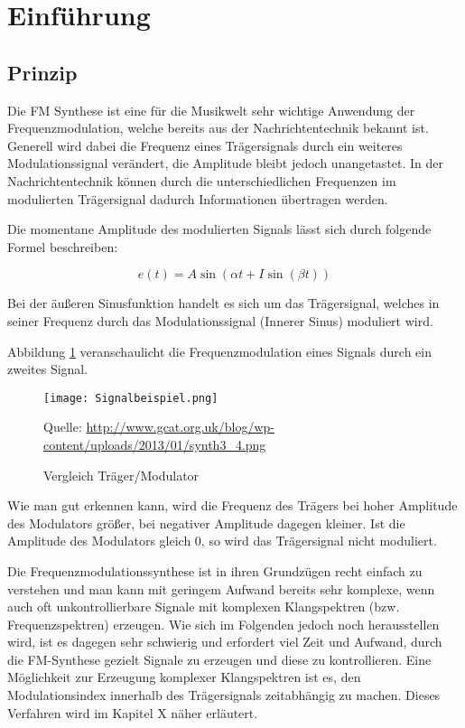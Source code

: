 \section{Einführung}

\subsection{Prinzip}
Die FM Synthese ist eine für die Musikwelt sehr wichtige Anwendung der Frequenzmodulation, welche bereits aus der Nachrichtentechnik bekannt ist. Generell wird dabei die Frequenz eines Trägersignals durch ein weiteres Modulationssignal verändert, die Amplitude bleibt jedoch unangetastet. In der Nachrichtentechnik können durch die unterschiedlichen Frequenzen im modulierten Trägersignal dadurch Informationen übertragen werden. 

Die momentane Amplitude des modulierten Signals lässt sich durch folgende Formel beschreiben:

\[
e(t) = A\sin(\alpha t + I\sin(\beta t)) 
\]

Bei der äußeren Sinusfunktion handelt es sich um das Trägersignal, welches in seiner Frequenz durch das Modulationssignal (Innerer Sinus) moduliert wird.


Abbildung \ref{fig:vergleichSignale} veranschaulicht die Frequenzmodulation eines Signals durch ein zweites Signal.

\begin{figure} [ht]
\centering
  \texttt{[image: Signalbeispiel.png]}
\caption{Vergleich Träger/Modulator}
\label{fig:vergleichSignale}
Quelle: \url{http://www.gcat.org.uk/blog/wp-content/uploads/2013/01/synth3_4.png}
\end{figure}

Wie man gut erkennen kann, wird die Frequenz des Trägers bei hoher Amplitude des Modulators größer, bei negativer Amplitude dagegen kleiner. Ist die Amplitude des Modulators gleich 0, so wird das Trägersignal nicht moduliert.

Die Frequenzmodulationssynthese ist in ihren Grundzügen recht einfach zu verstehen und man kann mit geringem Aufwand bereits sehr komplexe, wenn auch oft unkontrollierbare Signale mit komplexen Klangspektren (bzw. Frequenzspektren) erzeugen. Wie sich im Folgenden jedoch noch herausstellen wird, ist es dagegen sehr schwierig und erfordert viel Zeit und Aufwand, durch die FM-Synthese gezielt Signale zu erzeugen und diese zu kontrollieren. Eine Möglichkeit zur Erzeugung komplexer Klangspektren ist es, den Modulationsindex innerhalb des Trägersignals zeitabhängig zu machen. Dieses Verfahren wird im Kapitel X näher erläutert.

